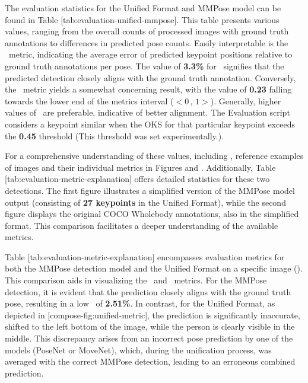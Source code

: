 The evaluation statistics for the Unified Format and MMPose model can be found in Table [tab:evaluation-unified-mmpose]. This table presents various values, ranging from the overall counts of processed images with ground truth annotations to differences in predicted pose counts. Easily interpretable is the \APE\ metric, indicating the average error of predicted keypoint positions relative to ground truth annotations per pose. The value of {\bf 3.3\%} for \APE\ signifies that the predicted detection closely aligns with the ground truth annotation. Conversely, the \OKS\ metric yields a somewhat concerning result, with the value of {\bf 0.23} falling towards the lower end of the metrics interval ($ <0\,,\,1> $). Generally, higher values of \OKS\ are preferable, indicative of better alignment. The Evaluation script considers a keypoint similar when the OKS for that particular keypoint exceeds the {\bf 0.45} threshold (This threshold was set experimentally.).

For a comprehensive understanding of these values, including \MSE, reference examples of images and their individual metrics in Figures  and . Additionally, Table [tab:evaluation-metric-explanation] offers detailed statistics for these two detections. The first figure illustrates a simplified version of the MMPose model output (consisting of {\bf 27 keypoints} in the Unified Format), while the second figure displays the original COCO Wholebody annotations, also in the simplified format. This comparison facilitates a deeper understanding of the available metrics.

Table [tab:evaluation-metric-explanation] encompasses evaluation metrics for both the MMPose detection model and the Unified Format on a specific image (). This comparison aids in visualizing the \APE\ and \MSE\ metrics. For the MMPose detection, it is evident that the prediction closely aligns with the ground truth pose, resulting in a low \APE\ of {\bf 2.51\%}. In contrast, for the Unified Format, as depicted in [compose-fig:unified-metric], the prediction is significantly inaccurate, shifted to the left bottom of the image, while the person is clearly visible in the middle. This discrepancy arises from an incorrect pose prediction by one of the models (PoseNet or MoveNet), which, during the unification process, was averaged with the correct MMPose detection, leading to an erroneous combined prediction.

